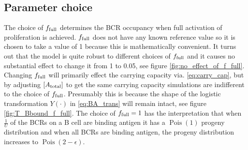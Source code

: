 \subsection{Parameter choice}
The choice of $f_{\text{full}}$ determines the BCR occupancy when full activation of proliferation is achieved.
$f_{\text{full}}$ does not have any known reference value so it is chosen to take a value of 1 because this is mathematically convenient.
It turns out that the model is quite robust to different choices of $f_{\text{full}}$ and it causes no substantial effect to change it from 1 to 0.05, see figure \ref{fig:no_effect_of_f_full}.
Changing $f_{\text{full}}$ will primarily effect the carrying capacity via. \eqref{eq:carry_cap}, but by adjusting $[A_{\text{total}}]$ to get the same carrying capacity simulations are indifferent to the choice of $f_{\text{full}}$.
Presumably this is because the shape of the logistic transformation $Y(\cdot)$ in \eqref{eq:BA_trans} will remain intact, see figure \ref{fig:T_Bbound_f_full}.
The choice of $f_{\text{full}} = 1$ has the interpretation that when $\frac{1}{U}$ of the BCRs on a B cell are binding antigen it has a $\operatorname{Pois}(1)$ progeny distribution and when all BCRs are binding antigen, the progeny distribution increases to $\operatorname{Pois}(2-\epsilon)$.
